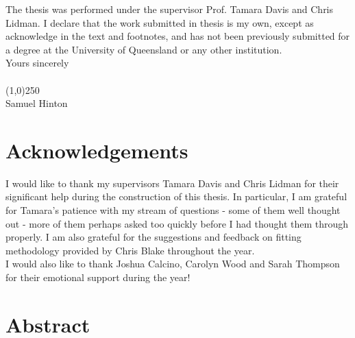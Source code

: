 \documentclass[titlesmallcaps, examinerscopy, copyrightpage]{uqthesis}
\begin{document}
\noindent The thesis was performed under the supervisor Prof. Tamara Davis and Chris Lidman. I declare that the work submitted in thesis is my own, except as acknowledge in the text and footnotes, and has not been previously submitted for a degree at the University of Queensland or any other institution. \\

\noindent Yours sincerely \\ \\ 

\noindent \line(1,0){250} \\

\noindent Samuel Hinton


\chapter{Acknowledgements}

I would like to thank my supervisors Tamara Davis and Chris Lidman for their significant help during the construction of this thesis. In particular, I am grateful for Tamara's patience with my stream of questions - some of them well thought out - more of them perhaps asked too quickly before I had thought them through properly. I am also grateful for the suggestions and feedback on fitting methodology provided by Chris Blake throughout the year.\\

I would also like to thank Joshua Calcino, Carolyn Wood and Sarah Thompson for their emotional support during the year!

\chapter{Abstract}
\end{document}
